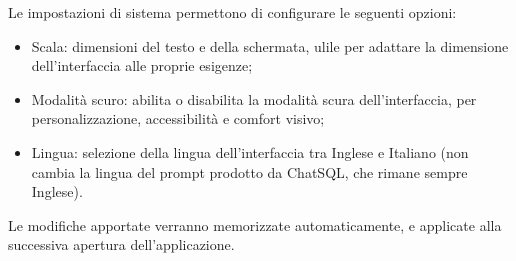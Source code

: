 \par Le impostazioni di sistema permettono di configurare le seguenti opzioni:
\begin{itemize}
  \item Scala: dimensioni del testo e della schermata, ulile per adattare la dimensione dell'interfaccia alle proprie esigenze;
  \item Modalità scuro: abilita o disabilita la modalità scura dell'interfaccia, per personalizzazione, accessibilità e comfort visivo;
  \item Lingua: selezione della lingua dell'interfaccia tra Inglese e Italiano (non cambia la lingua del prompt prodotto da ChatSQL, che rimane sempre Inglese).
\end{itemize}
\par Le modifiche apportate verranno memorizzate automaticamente, e applicate alla successiva apertura dell'applicazione.